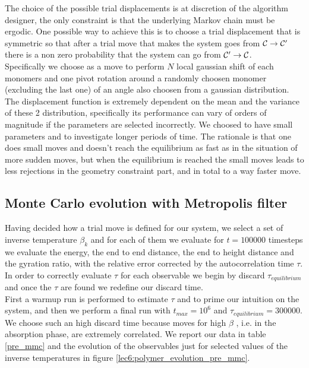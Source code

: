 The choice of the possible trial displacements is at discretion of the algorithm designer, the only constraint is that the underlying Markov 
chain must be ergodic. One possible way to achieve this is to choose a trial displacement that is symmetric so that after a trial move that makes 
the system goes from $\mathcal{C} \to \mathcal{C}'$ there is a non zero probability that the system can go from $\mathcal{C}' \to \mathcal{C}$. \\
Specifically we choose as a move to perform $N$ local gaussian shift of each monomers and one pivot rotation around a 
randomly choosen monomer (excluding the last one) of an angle also choosen from a gaussian distribution. \\
The displacement function is extremely dependent on the mean and the variance of these 2 distribution, specifically its performance can 
vary of orders of magnitude if the parameters are selected incorrectly. 
We choosed to have small parameters and to investigate longer periods of time. The rationale is that one does small moves and doesn't reach 
the equilibrium as fast as in the situation of more sudden moves, but when the equilibrium is reached the small moves leads to less rejections
in the geometry constraint part, and in total to a way faster move.

\subsection*{Monte Carlo evolution with Metropolis filter}
Having decided how a trial move is defined for our system, we select a set of inverse temperature $\beta_k$ and for each of them we evaluate for $t = 100000$ timesteps
we evaluate the energy, the end to end distance, the end to height distance and the gyration ratio, with the relative error corrected by the
autocorrelation time $\tau$. In order to correctly evaluate $\tau$ for each observable we begin by discard $\tau_{equilibrium}$ and 
once the $\tau$ are found we redefine our discard time.\\
First a warmup run is performed to estimate $\tau$ and to prime our intuition on the system, and then we perform a final run with $t_{max} = 10^6$ and $\tau_{equilibrium} = 300000$.
We choose such an high discard time because moves for high $\beta$ , i.e. in the absorption phase, are extremely correlated.
We report our data in table \ref{pre_mmc} and the evolution of the observables just for selected values of the inverse temperatures in figure \ref{lec6:polymer_evolution_pre_mmc}.

